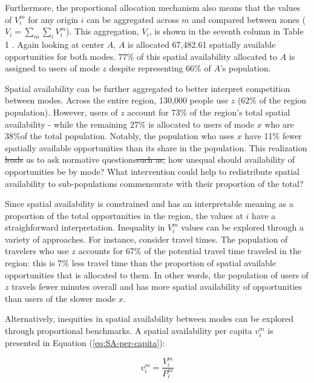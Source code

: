 \documentclass[10pt,letterpaper]{article}
\providecommand{\DIFaddtex}[1]{{\protect\color{blue}\uwave{#1}}} %
\providecommand{\DIFdeltex}[1]{{\protect\color{red}\sout{#1}}}                      %
\providecommand{\DIFaddbegin}{} %
\providecommand{\DIFaddend}{} %
\providecommand{\DIFdelbegin}{} %
\providecommand{\DIFdelend}{} %
\providecommand{\DIFadd}[1]{\texorpdfstring{\DIFaddtex{#1}}{#1}} %
\providecommand{\DIFdel}[1]{\texorpdfstring{\DIFdeltex{#1}}{}} %
\newcommand{\DIFscaledelfig}{0.5}
\newlength{\DIFdelgraphicswidth} %
\newlength{\DIFdelgraphicsheight} %
\newcommand{\DIFaddincludegraphics}[2][]{{\color{blue}\fbox{\DIFOincludegraphics[#1]{#2}}}} %
\newcommand{\DIFdelincludegraphics}[2][]{%
\sbox{\DIFdelgraphicsbox}{\DIFOincludegraphics[#1]{#2}}%
\settoboxwidth{\DIFdelgraphicswidth}{\DIFdelgraphicsbox} %
\settoboxtotalheight{\DIFdelgraphicsheight}{\DIFdelgraphicsbox} %
\scalebox{\DIFscaledelfig}{%
\parbox[b]{\DIFdelgraphicswidth}{\usebox{\DIFdelgraphicsbox}\\[-\baselineskip] \rule{\DIFdelgraphicswidth}{0em}}\llap{\resizebox{\DIFdelgraphicswidth}{\DIFdelgraphicsheight}{%
\setlength{\unitlength}{\DIFdelgraphicswidth}%
\begin{picture}(1,1)%
\thicklines\linethickness{2pt} %
{\color[rgb]{1,0,0}\put(0,0){\framebox(1,1){}}}%
{\color[rgb]{1,0,0}\put(0,0){\line( 1,1){1}}}%
{\color[rgb]{1,0,0}\put(0,1){\line(1,-1){1}}}%
\end{picture}%
}\hspace*{3pt}}} %
} %
\DeclareRobustCommand{\DIFaddbegin}{\DIFOaddbegin \let\includegraphics\DIFaddincludegraphics} %
\DeclareRobustCommand{\DIFaddend}{\DIFOaddend \let\includegraphics\DIFOincludegraphics} %
\DeclareRobustCommand{\DIFdelbegin}{\DIFOdelbegin \let\includegraphics\DIFdelincludegraphics} %
\DeclareRobustCommand{\DIFdelend}{\DIFOaddend \let\includegraphics\DIFOincludegraphics} %
\begin{document}
Furthermore, the proportional allocation mechanism also means that the
values of \(V_i^m\) for any origin \(i\) can be aggregated across \(m\)
and compared between zones (\(V_i = \sum_m{\sum_i{V_i^m}}\)). This
aggregation, \(V_i\), is shown in the seventh column in Table 1 . Again
looking at center \(A\), \(A\) is allocated 67,482.61 spatially
available opportunities for both modes. 77\% of this spatial
availability allocated to \(A\) is assigned to users of mode \(z\)
despite representing 66\% of \(A\)'s population.

Spatial availability can be further aggregated to better interpret
competition between modes. Across the entire region, 130,000 people use
\(z\) (62\% of the region population). However, users of \(z\) account
for 73\% of the region's total spatial availability - while the
remaining 27\% is allocated to users of mode \(x\) who are 38\%of the
total population. Notably, the population who uses \(x\) have 11\% fewer
spatially available opportunities than its share in the population. This
realization \DIFdelbegin \DIFdel{leads }\DIFdelend \DIFaddbegin \DIFadd{could lead }\DIFaddend us to ask normative questions\DIFdelbegin \DIFdel{such as, }\DIFdelend \DIFaddbegin \DIFadd{: }\DIFaddend how unequal should
availability of opportunities be by mode? What intervention could help
to redistribute spatial availability to sub-populations commensurate
with their proportion of the total?

Since spatial availability is constrained and has an interpretable
meaning as a proportion of the total opportunities in the region, the
values at \(i\) have a straighforward interpretation. Inequality in
\(V_i^m\) values can be explored through a variety of approaches. For
instance, consider travel times. The population of travelers who use
\(z\) accounts for 67\% of the potential travel time traveled in the
region: this is 7\% less travel time than the proportion of spatial
available opportunities that is allocated to them. In other words, the
population of users of \(z\) travels fewer minutes overall and has more
spatial availability of opportunities than users of the slower mode
\(x\).

Alternatively, inequities in spatial availability between modes can be
explored through proportional benchmarks. A spatial availability per
capita \(v_i^m\) is presented in Equation (\ref{eq:SA-per-capita}):

\begin{equation}
\label{eq:SA-per-capita}
v_{i}^m = \frac{V_{i}^m}{P_{i}^m}
\end{equation}
\end{document}
